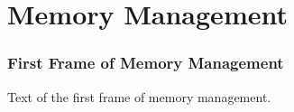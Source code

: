 \section{Memory Management}

\begin{frame}
    \frametitle{First Frame of Memory Management}
    
    Text of the first frame of memory management.

\end{frame}
